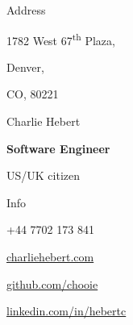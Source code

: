 \noindent
\begin{minipage}[t]{0.333\textwidth}
  {\huge Address}

  \setlength{\parskip}{0.4cm}

  1782 West 67\textsuperscript{th} Plaza,
  
  Denver,
  
  CO, 80221
\end{minipage}
\noindent
\begin{minipage}[t]{0.333\textwidth}
  \vspace*{\fill}
  \begin{center}
    {\Huge Charlie Hebert}

    \setlength{\parskip}{0.5cm}
    
    \textbf{Software Engineer}
    
    US/UK citizen
  \end{center}
  \vspace*{\fill}
\end{minipage}
\noindent
\begin{minipage}[t]{0.333\textwidth}
  \begin{flushright}
    {\huge Info}\\
  \end{flushright}

  \begin{description}
    \raggedleft
    \item[Mob] +44 7702 173 841
    \item[Web] \href{http://www.charliehebert.com}{charliehebert.com}
    \item[Github] \href{http://www.github.com/chooie}{github.com/chooie}
    \item[LinkedIn] \href{http://linkedin.com/in/hebertc}{linkedin.com/in/hebertc}
  \end{description}
\end{minipage}

